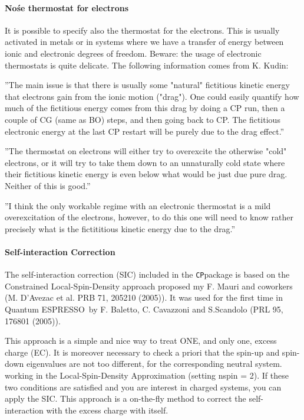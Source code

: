 \documentclass[12pt,a4paper]{article}
\def\qe{{\sc Quantum ESPRESSO}}
\def\CP{\texttt{CP}}
\begin{document}
\paragraph{ No\'se thermostat for electrons }

It is possible to specify also the thermostat for the electrons. This is
usually activated in metals or in systems where we have a transfer of
energy between ionic and electronic degrees of freedom. Beware: the
usage of electronic thermostats is quite delicate. The following information 
comes from K. Kudin: 

''The main issue is that there is usually some "natural" fictitious kinetic 
energy that electrons gain from the ionic motion ("drag"). One could easily 
quantify how much of the fictitious energy comes from this drag by doing a CP 
run, then a couple of CG (same as BO) steps, and then going back to CP.
The fictitious electronic energy at the last CP restart will be purely 
due to the drag effect.''

''The thermostat on electrons will either try to overexcite the otherwise 
"cold" electrons, or it will try to take them down to an unnaturally cold 
state where their fictitious kinetic energy is even below what would be 
just due pure drag. Neither of this is good.''

''I think the only workable regime with an electronic thermostat is a 
mild overexcitation of the electrons, however, to do this one will need 
to know rather precisely what is the fictititious kinetic energy due to the
drag.''

\paragraph{ Self-interaction Correction }

The self-interaction correction (SIC) included in the \CP package is based
on the Constrained Local-Spin-Density approach proposed my F. Mauri and 
coworkers (M. D'Avezac et al. PRB 71, 205210 (2005)). It was used for
the first time in \qe\ by F. Baletto, C. Cavazzoni 
and S.Scandolo (PRL 95, 176801 (2005)).

This approach is a simple and nice way to treat ONE, and only one, 
excess charge (EC). It is moreover necessary to check a priori that 
the spin-up and spin-down eigenvalues are not too different, for the 
corresponding neutral system. working in the Local-Spin-Density 
Approximation (setting nspin = 2). If these two conditions are satisfied
and you are interest in charged systems, you can apply the SIC.
This approach is a on-the-fly method to correct the self-interaction 
with the excess charge with itself.
\end{document}
